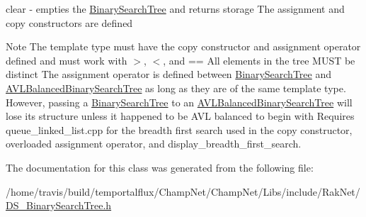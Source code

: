 clear -\/ empties the \hyperlink{class_data_structures_1_1_binary_search_tree}{Binary\-Search\-Tree} and returns storage The assignment and copy constructors are defined

\begin{DoxyNote}{Note}
The template type must have the copy constructor and assignment operator defined and must work with $>$, $<$, and == All elements in the tree M\-U\-S\-T be distinct The assignment operator is defined between \hyperlink{class_data_structures_1_1_binary_search_tree}{Binary\-Search\-Tree} and \hyperlink{class_data_structures_1_1_a_v_l_balanced_binary_search_tree}{A\-V\-L\-Balanced\-Binary\-Search\-Tree} as long as they are of the same template type. However, passing a \hyperlink{class_data_structures_1_1_binary_search_tree}{Binary\-Search\-Tree} to an \hyperlink{class_data_structures_1_1_a_v_l_balanced_binary_search_tree}{A\-V\-L\-Balanced\-Binary\-Search\-Tree} will lose its structure unless it happened to be A\-V\-L balanced to begin with Requires queue\-\_\-linked\-\_\-list.\-cpp for the breadth first search used in the copy constructor, overloaded assignment operator, and display\-\_\-breadth\-\_\-first\-\_\-search. 
\end{DoxyNote}


The documentation for this class was generated from the following file\-:\begin{DoxyCompactItemize}
\item 
/home/travis/build/temportalflux/\-Champ\-Net/\-Champ\-Net/\-Libs/include/\-Rak\-Net/\hyperlink{_d_s___binary_search_tree_8h}{D\-S\-\_\-\-Binary\-Search\-Tree.\-h}\end{DoxyCompactItemize}
